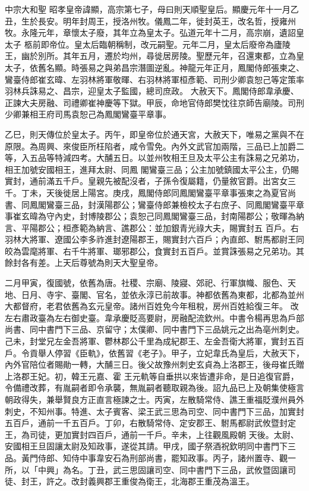
\begin{pinyinscope}

 中宗大和聖
 昭孝皇帝諱顯，高宗第七子，母曰則天順聖皇后。顯慶元年十一月乙丑，生於長安。明年封周王，授洛州牧。儀鳳二年，徙封英王，改名哲，授雍州牧。永隆元年，章懷太子廢，其年立為皇太子。弘道元年十二月，高宗崩，遺詔皇
 太子
 柩前即帝位。皇太后臨朝稱制，改元嗣聖。元年二月，皇太后廢帝為廬陵王，幽於別所。其年五月，遷於均州，尋徙居房陵。聖歷元年，召還東都，立為皇太子，依舊名顯。時張易之與弟昌宗潛圖逆亂。神龍元年正月，鳳閣侍郎張柬之、鸞臺侍郎崔玄暐、左羽林將軍敬暉、右羽林將軍桓彥範、司刑少卿袁恕己等定策率羽林兵誅易之、昌宗，迎皇太子監國，總司庶政。
 大赦天下。鳳閣侍郎韋承慶、正諫大夫房融、司禮卿崔神慶等下獄。甲辰，命地官侍郎樊忱往京師告廟陵。司刑少卿兼相王府司馬袁恕己為鳳閣鸞臺平章事。



 乙巳，則天傳位於皇太子。丙午，即皇帝位於通天宮，大赦天下，唯易之黨與不在原限。為周興、來俊臣所枉陷者，咸令雪免。內外文武官加兩階，三品已上加爵二等，入五品等特減四考。大酺五日。以並州牧相王旦及太平公主有誅易之兄弟功，相王加號安國相王，進拜太尉、同鳳
 閣鸞臺三品；公主加號鎮國太平公主，仍賜實封，通前滿五千戶。皇親先被配沒者，子孫令復屬籍，仍量敘官爵。出宮女三千。丁未，天後徙居上陽宮。庚戌，鳳閣侍郎同鳳閣鸞臺平章事張柬之為夏官尚書、同鳳閣鸞臺三品，封漢陽郡公；鸞臺侍郎兼檢校太子右庶子、同鳳閣鸞臺平章事崔玄暐為守內史，封博陵郡公；袁恕己同鳳閣鸞臺三品，封南陽郡公；敬暉為納言、平陽郡公；桓彥範為納言、譙郡公：並加銀青光祿大夫，賜實封五
 百戶。右羽林大將軍、遼國公李多祚進封遼陽郡王，賜實封六百戶；內直郎、駙馬都尉王同皎為雲麾將軍、右千牛將軍、瑯邪郡公，食實封五百戶。並賞誅張易之兄弟功。其餘封各有差。上天后尊號為則天大聖皇帝。



 二月甲寅，復國號，依舊為唐。社稷、宗廟、陵寢、郊祀、行軍旗幟、服色、天地、日月、寺宇、臺閣、官名，並依永淳已前故事。神都依舊為東都，北都為並州大都督府，老君依舊為玄元皇帝。諸州百姓免今年租稅，房州百姓給復三年。
 改左右肅政臺為左右御史臺。韋承慶貶高要尉，房融配流欽州。中書令楊再思為戶部尚書、同中書門下三品、京留守；太僕卿、同中書門下三品姚元之出為亳州刺史。己未，封堂兄左金吾將軍、鬱林郡公千里為成紀郡王、左金吾衛大將軍，實封五百戶。令貢舉人停習《臣軌》，依舊習《老子》。甲子，立妃韋氏為皇后，大赦天下，內外官陪位者賜勛一轉，大酺三日。後父故豫州刺史玄貞為上洛郡王，後母崔氏贈上洛郡王妃。初，韓王元嘉、霍
 王元軌等自垂拱以來皆遭非命，是日追復官爵，令備禮改葬，有胤嗣者即令承襲，無胤嗣者聽取親為後。詔九品已上及朝集使極言朝政得失，兼舉賢良方正直言極諫之士。丙寅，左散騎常侍、譙王重福貶濮州員外刺史，不知州事。特進、太子賓客、梁王武三思為司空、同中書門下三品，加實封五百戶，通前一千五百戶。丁卯，右散騎常侍、定安郡王、駙馬都尉武攸暨封定王，為司徒，更加實封四百戶，通前一千戶。辛未，上往觀風殿朝
 天後。太尉、安國相王旦固讓太尉及知政事，遂從其請。甲戌，國子祭酒祝欽明同中書門下三品。黃門侍郎、知侍中事韋安石為刑部尚書，罷知政事。丙子，諸州置寺、觀一所，以「中興」為名。丁丑，武三思固讓司空、同中書門下三品，武攸暨固讓司徒、封王，許之。改封義興郡王重俊為衛王，北海郡王重茂為溫王。




\end{pinyinscope}
